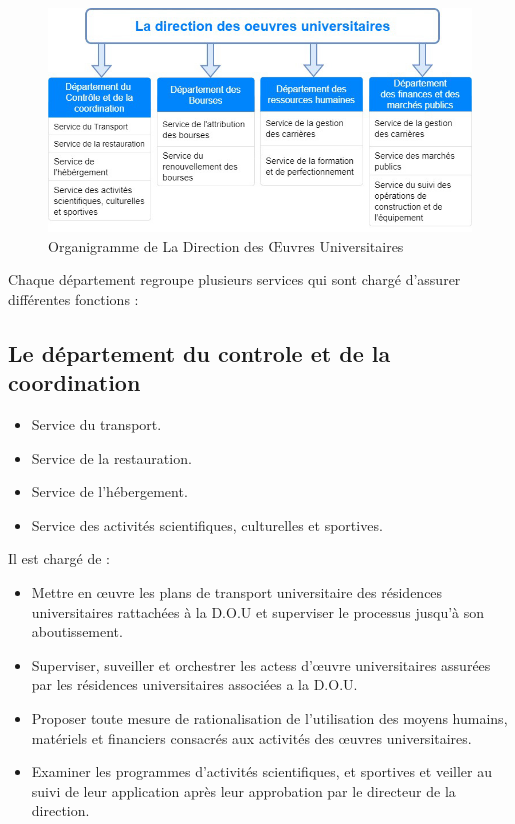     \begin{figure}[H]
        \centering
            \includegraphics[scale=0.6]{chapitre1/direction-org.jpg}
        \caption{Organigramme de La Direction des Œuvres Universitaires}
    \end{figure}

    Chaque département regroupe plusieurs services qui sont chargé d'assurer différentes fonctions :

    \subsection{Le département du controle et de la coordination}
        \begin{itemize}
            \item Service du transport.
            \item Service de la restauration.
            \item Service de l'hébergement.
            \item Service des activités scientifiques, culturelles et sportives.\\
        \end{itemize}
        
        Il est chargé de :
        \begin{itemize}\renewcommand{\labelitemi}{$\bullet$}
            \item Mettre en œuvre les plans de transport universitaire des résidences universitaires rattachées à la \acs{D.O.U} et superviser le processus jusqu'à son aboutissement.
            \item Superviser, suveiller et orchestrer les actess d'œuvre universitaires assurées par les résidences universitaires associées a la \acs{D.O.U}.
            \item Proposer toute mesure de rationalisation de l'utilisation des moyens humains, matériels et financiers consacrés aux activités des œuvres universitaires.
            \item Examiner les programmes d'activités scientifiques, et sportives et veiller  au suivi de leur application après leur approbation par le directeur de la direction.
        \end{itemize}

